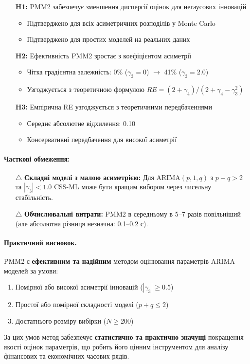 \begin{itemize}
    \item[\checkmark] \textbf{H1:} PMM2 забезпечує зменшення дисперсії оцінок для негаусових інновацій
    \begin{itemize}
        \item Підтверджено для всіх асиметричних розподілів у Monte Carlo
        \item Підтверджено для простих моделей на реальних даних
    \end{itemize}

    \item[\checkmark] \textbf{H2:} Ефективність PMM2 зростає з коефіцієнтом асиметрії
    \begin{itemize}
        \item Чітка градієнтна залежність: 0\% ($\gamma_3=0$) $\rightarrow$ 41\% ($\gamma_3=2.0$)
        \item Узгоджується з теоретичною формулою $RE = (2+\gamma_4)/(2+\gamma_4-\gamma_3^2)$
    \end{itemize}

    \item[\checkmark] \textbf{H3:} Емпірична RE узгоджується з теоретичними передбаченнями
    \begin{itemize}
        \item Середнє абсолютне відхилення: 0.10
        \item Консервативні передбачення для високої асиметрії
    \end{itemize}
\end{itemize}

\paragraph{Часткові обмеження:}

\begin{itemize}
    \item[$\triangle$] \textbf{Складні моделі з малою асиметрією:} Для ARIMA$(p,1,q)$ з $p+q > 2$ та $|\gamma_3| < 1.0$ CSS-ML може бути кращим вибором через чисельну стабільність.

    \item[$\triangle$] \textbf{Обчислювальні витрати:} PMM2 в середньому в 5--7 разів повільніший (але абсолютна різниця незначна: 0.1--0.2 с).
\end{itemize}

\paragraph{Практичний висновок.}
PMM2 є \textbf{ефективним та надійним} методом оцінювання параметрів ARIMA моделей за умови:
\begin{enumerate}
    \item Помірної або високої асиметрії інновацій ($|\gamma_3| \geq 0.5$)
    \item Простої або помірної складності моделі ($p+q \leq 2$)
    \item Достатнього розміру вибірки ($N \geq 200$)
\end{enumerate}

За цих умов метод забезпечує \textbf{статистично та практично значущі} покращення якості оцінок параметрів, що робить його цінним інструментом для аналізу фінансових та економічних часових рядів.
